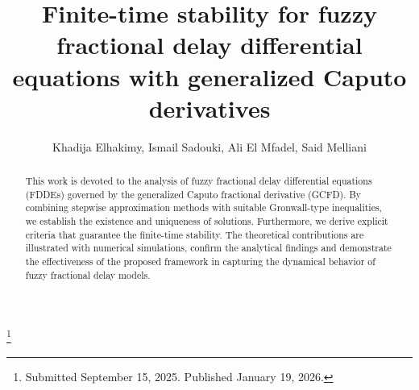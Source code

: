 \documentclass[reqno]{amsart}
\begin{document}
\title[\hfilneg EJDE-2026/07\hfil 
Stability for fuzzy fractional delay differential equations]
{Finite-time stability for fuzzy fractional delay differential equations with generalized 
Caputo derivatives}


\author[K. Elhakimy, I. Sadouki, A. El Mfadel, S. Melliani \hfil EJDE-2026/07\hfilneg]
{Khadija Elhakimy, Ismail Sadouki, Ali El Mfadel, Said Melliani}

\address{Khadija Elhakimy \newline
Sultan Moulay Slimane University,
Laboratory of Applied Mathematics and Scientific Computing,
Beni Mellal, Morocco}

\address{Ismail Sadouki \newline
Sultan Moulay Slimane University,
Laboratory of Applied Mathematics and Scientific Computing,
Beni Mellal, Morocco}

\address{Ali El Mfadel \newline
Sultan Moulay Slimane University,
Laboratory of Applied Mathematics and Scientific Computing,
Beni Mellal, Morocco}

\address{Said Melliani \newline
Sultan Moulay Slimane University,
Laboratory of Applied Mathematics and Scientific Computing,
Beni Mellal, Morocco}

\thanks{Submitted September 15, 2025. Published January 19, 2026.}

\begin{abstract}
This work is devoted to the analysis of fuzzy fractional delay differential equations
(FDDEs) governed by the generalized Caputo fractional derivative (GCFD).
By combining stepwise approximation methods with suitable Gronwall-type inequalities,
we establish the existence and uniqueness of solutions. Furthermore, we
derive explicit criteria that guarantee the finite-time stability.
The theoretical contributions are illustrated with numerical simulations,
confirm the analytical findings and demonstrate the effectiveness
of the proposed framework in capturing the dynamical behavior of fuzzy fractional
delay models.
\end{abstract}

\maketitle
{}
\newtheorem{theorem}{Theorem}[section]
\newtheorem{lemma}[theorem]{Lemma}
\newtheorem{definition}[theorem]{Definition}
\newtheorem{remark}[theorem]{Remark}
\allowdisplaybreaks
\end{document}
